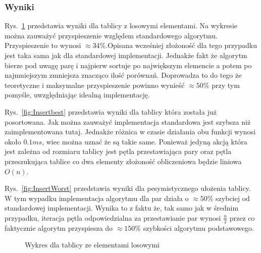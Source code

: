 \subsubsection*{Wyniki}
\par Rys.~\ref{fig:insertRand} przedstawia wyniki dla tablicy z losowymi elementami. Na wykresie można zauważyć przyspieszenie względem standardowego algorytmu. Przyspieszenie to wynosi $ \approx 34 \% $.Opisana wcześniej złożoność dla tego przypadku jest taka sama jak dla standardowej implementacji. Jednakże fakt że algorytm bierze pod uwagę parę i najpierw sortuje po największym elemencie a potem po najmniejszym zmniejsza znacząco ilość porównań. Doprowadza to do tego że teoretyczne i maksymalne przyspieszenie powinno wynieść $ \approx 50\% $ przy tym pomyśle, uwzględniając idealną implementację.
\par Rys.~\ref{fig:Insertbest} przedstawia wyniki dla tablicy która została już posortowana. Jak można zauważyć implementacja standardowa jest szybsza niż zaimplementowana tutaj. Jednakże różnica w czasie działania obu funkcji wynosi około $0.1ms$, wiec można uznać że są takie same. Ponieważ jedyną akcją która jest zależna od rozmiaru tablicy jest pętla przestawiająca pary oraz pętla przeszukująca tablice co dwa elementy złożoność obliczeniowa będzie liniowa $O(n)$.
\par Rys.~\ref{fig:InsertWorst} przedstawia wyniki dla pesymistycznego ułożenia tablicy. W tym wypadku implementacja algorytmu dla par działa o $\approx 50 \% $ szybciej od standardowej implementacji. Wynika to z faktu że, tak samo jak w średnim przypadku, iteracja pętla odpowiedzialna za przestawianie par wynosi $\frac{n}{2}$ przez co faktycznie algorytm przyspiesza do $\approx 150 \% $ szybkości algorytmu podstawowego.
\begin{figure}[!h]
  \begin{center}
    \caption{Wykres dla tablicy ze elementami losowymi}\label{fig:insertRand}
  \end{center}
\end{figure}\FloatBarrier

